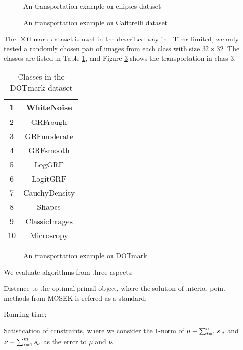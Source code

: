 \documentclass[english]{pkupaper}
\begin{document}
\begin{figure}
\centering \scalebox{0.65}{} 
\caption{An transportation example on ellipses dataset} \label{Fig:Ellipse}
\end{figure}

\begin{figure}
\centering \scalebox{0.65}{}
\caption{An transportation example on  Caffarelli dataset} \label{Fig:Caff}
\end{figure}

The DOTmark dataset is used in the described way in \parencite{Schrieber2017}. Time limited, we only tested a randomly chosen pair of images from each class with size $ 32 \times 32 $. The classes are listed in Table \ref{Tbl:DOTmark}, and Figure \ref{Fig:DOTMark} shows the transportation in class 3.

\begin{table}[htbp]
\centering
\begin{tabular}{|c|c|}
\hline
1 & WhiteNoise \\ \hline
2 & GRFrough \\ \hline
3 & GRFmoderate \\ \hline
4 & GRFsmooth \\ \hline
5 & LogGRF \\ \hline
6 & LogitGRF \\ \hline
7 & CauchyDensity \\ \hline
8 & Shapes \\ \hline
9 & ClassicImages \\ \hline
10 & Microscopy \\ \hline
\end{tabular}
\caption{Classes in the DOTmark dataset} \label{Tbl:DOTmark}
\end{table}

\begin{figure}
\centering
\scalebox{0.33}{} 
\hspace{-1cm}
\scalebox{0.33}{} 
\hspace{-1cm}
\scalebox{0.33}
{}
\caption{An transportation example on DOTmark} \label{Fig:DOTMark}
\end{figure}

We evaluate algorithms from three aspects:
\begin{partlist}
\item Distance to the optimal primal object, where the solution of interior point methods from MOSEK is refered as a standard;
\item Running time;
\item Satisfication of constraints, where we consider the $1$-norm of $ \mu - \sum_{ {j} = {1} }^{n}{s_{ \cdot j }} $ and $ \nu - \sum_{ {i} = {1} }^{m}{s_{ i \cdot }}$ as the error to $\mu$ and $\nu$.
\end{partlist}
\end{document}
